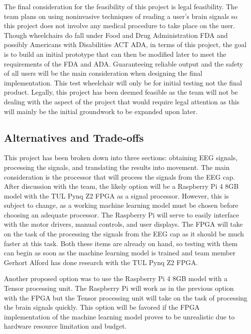 \documentclass[conference]{IEEEtran}
\begin{document}
    The final consideration for the feasibility of this project is legal feasibility. The team plans on using noninvasive techniques of reading a user's brain signals so this project does not involve any medical procedure to take place on the user. Though wheelchairs do fall under Food and Drug Administration FDA and possibly Americans with Disabilities ACT ADA, in terms of this project, the goal is to build an initial prototype that can then be modified later to meet the requirements of the FDA and ADA. Guaranteeing reliable output and the safety of all users will be the main consideration when designing the final implementation. This test wheelchair will only be for initial testing not the final product. Legally, this project has been deemed feasible as the team will not be dealing with the aspect of the project that would require legal attention as this will mainly be the initial groundwork to be expanded upon later. 

    \subsection{Alternatives and Trade-offs}
    This project has been broken down into three sections: obtaining EEG signals, processing the signals, and translating the results into movement. The main consideration is the processor that will process the signals from the EEG cap. After discussion with the team, the likely option will be a Raspberry Pi 4 8GB model with the TUL Pynq Z2 FPGA as a signal processor. However, this is subject to change, as a working machine learning model must be chosen before choosing an adequate processor. The Raspberry Pi will serve to easily interface with the motor drivers, manual controls, and user displays. The FPGA will take on the task of the processing the signals from the EEG cap as it should be much faster at this task. Both these items are already on hand, so testing with them can begin as soon as the machine learning model is trained and team member Gerhort Alford has done research with the TUL Pynq Z2 FPGA.

    Another proposed option was to use the Raspberry Pi 4 8GB model with a Tensor processing unit. The Raspberry Pi will work as in the previous option with the FPGA but the Tensor processing unit will take on the task of processing the brain signals quickly. This option will be favored if the FPGA implementation of the machine learning model proves to be unrealistic due to hardware resource limitation and budget.  
\end{document}
